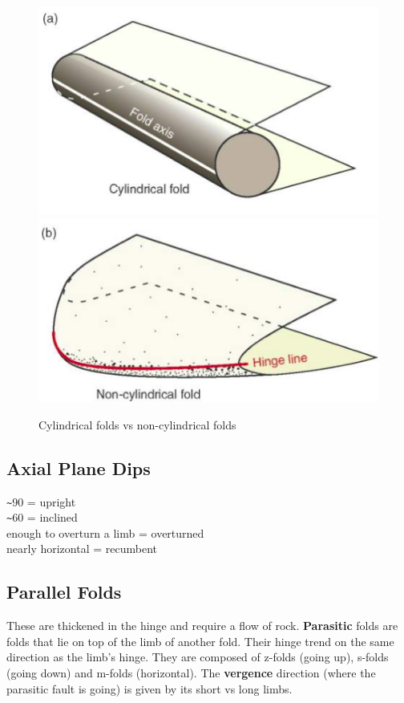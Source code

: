 \documentclass[12pt,a4paper]{report}
\begin{document}
\begin{figure}[h]
  \includegraphics[scale=0.30]{cylindrical-fold.png}
  \includegraphics[scale=0.30]{non-cylindrical-fold.png}
  \centering
  \caption{Cylindrical folds vs non-cylindrical folds}
\end{figure}

\subsection*{Axial Plane Dips}
\verb|~|90 = upright\\
\verb|~|60 = inclined\\
enough to overturn a limb = overturned\\
nearly horizontal = recumbent

\subsection*{Parallel Folds}
These are thickened in the hinge and require a flow of rock.
\textbf{Parasitic} folds are folds that lie on top of the limb of another fold.
Their hinge trend on the same direction as the limb's hinge.
They are composed of z-folds (going up), s-folds (going down) and m-folds (horizontal).
The \textbf{vergence} direction (where the parasitic fault is going) is given by its short vs long limbs.
\end{document}
